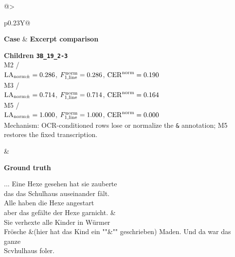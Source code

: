 \begin{table}[p]
  \centering
  \caption{Full excerpt block for the Children Handwritten OCR-noise recovery case from Table~\ref{tab:exp_linebreak_comparison}. Metric values in the case column are whitespace-normalized per-sample values, not macro-averages over sample IDs; explicit \texttt{\textbackslash n} markers show true line boundaries. The excerpt preserves the diplomatic \texttt{\&} annotation and apparent spelling anomalies verbatim.}
  \label{tab:app_qualitative_ocr_excerpt}
  \scriptsize
  \renewcommand{\arraystretch}{1.08}
  \setlength{\tabcolsep}{4pt}
  \begin{tabularx}{\linewidth}{@{}>{\raggedright\arraybackslash}p{0.23\linewidth}Y@{}}
    \toprule
    \textbf{Case} & \textbf{Excerpt comparison} \\
    \midrule
    {\raggedright
    \textbf{Children \texttt{3B\_19\_2-3}}\\
    M2 / \GPTFiveMarchShort\\
    \(\mathrm{LA}_{\mathrm{norm}\pm}=0.286\), \(F_{1,\mathrm{line}}^{\mathrm{norm}}=0.286\), \(\mathrm{CER}^{\mathrm{norm}}=0.190\)\\
    M3 / \GPTFiveMarchShort\\
    \(\mathrm{LA}_{\mathrm{norm}\pm}=0.714\), \(F_{1,\mathrm{line}}^{\mathrm{norm}}=0.714\), \(\mathrm{CER}^{\mathrm{norm}}=0.164\)\\
    M5 / \GPTFiveShort\\
    \(\mathrm{LA}_{\mathrm{norm}\pm}=1.000\), \(F_{1,\mathrm{line}}^{\mathrm{norm}}=1.000\), \(\mathrm{CER}^{\mathrm{norm}}=0.000\)\\
    Mechanism: OCR-conditioned rows lose or normalize the \texttt{\&} annotation; M5 restores the fixed transcription.\par}
    &
    \begin{minipage}[t]{\hsize}
      \textbf{Ground truth}\par
      {\raggedright\ttfamily
      ... Eine Hexe gesehen hat sie zauberte\excerptnl\\
      das das Schulhaus auseinander fält.\excerptnl\\
      Alle haben die Hexe angestart\excerptnl\\
      aber das gefälte der Hexe garnicht. \&\excerptnl\\
      Sie verhexte alle Kinder in Würmer\excerptnl\\
      Frösche \&(hier hat das Kind ein ""\&"" geschrieben) Maden. Und da war das ganze\excerptnl\\
      Scvhulhaus foler.\par}
      \vspace{0.3em}

\end{minipage}
\end{tabularx}
\end{table}
